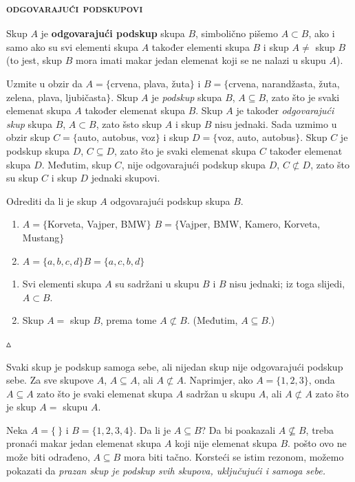\documentclass[a4paper,14pt,svgnames]{article}
\newcounter{counter}
\newcommand{\examplecounter}{\textbf{\refstepcounter{counter}PRIMJER \thecounter}}
\newcommand{\example}[3]{\begin{tcolorbox}[title=\large \examplecounter \hfill\small\textbf{"#1"}]
#2
\begin{tcolorbox}[title=\small \textbf{RJEŠENJE},colback=white]
\begin{center}
#3

\vspace{0.5em}\hfill $\vartriangle$
\end{center}
\end{tcolorbox}
\end{tcolorbox}}
\begin{document}
\subsubsection{\textsc{odgovarajući podskupovi}}
\begin{tcolorbox}
Skup $A$ je \textbf{odgovarajući podskup} skupa $B$, simbolično pišemo $A\subset B$, ako i samo ako su svi elementi skupa $A$ također elementi skupa $B$ i skup $A\neq$ skup $B$(to jest, skup $B$ mora imati makar jedan elemenat koji se ne nalazi u skupu $A$).
\end{tcolorbox}

Uzmite u obzir da $A=\{$crvena, plava, žuta$\}$ i $B=\{$crvena, narandžasta, žuta, zelena, plava, ljubičasta$\}$. Skup $A$ je \textit{podskup} skupa $B$, $A\subseteq B$, zato što je svaki elemenat skupa $A$ također elemenat skupa $B$. Skup $A$ je također \textit{odgovarajući skup} skupa $B$, $A\subset B$, zato šsto skup $A$ i skup $B$ nisu jednaki. Sada uzmimo u obzir skup $C=\{$auto, autobus, voz$\}$ i skup $D=\{$voz, auto, autobus$\}$. Skup $C$ je podskup skupa $D$, $C\subseteq D$, zato što je svaki elemenat skupa $C$ također elemenat skupa $D$. Međutim, skup $C$, nije odgovarajući podskup skupa $D$, $C\not\subset D$, zato što su skup $C$ i skup $D$ jednaki skupovi.
\newpage

\example{Da li je skup odgovarajući podskup?}{Odrediti da li je skup $A$ odgovarajući podskup skupa $B$.
\begin{enumerate}[label=\alph*),leftmargin=0.5cm]
\item $A=\{$Korveta, Vajper, BMW$\}$
$B=\{$Vajper, BMW, Kamero, Korveta, Mustang$\}$
\item $A=\{a, b, c, d\}$\quad $B=\{a, c, b, d\}$
\end{enumerate}}{\begin{enumerate}[label=\alph*),leftmargin=0.5cm]
\item Svi elementi skupa $A$ su sadržani u skupu $B$ i $B$ nisu jednaki; iz toga slijedi, $A\subset B$.
\item Skup $A=$ skup $B$, prema tome $A\not\subset B$. (Međutim, $A\subseteq B.$)
\end{enumerate}}

Svaki skup je podskup samoga sebe, ali nijedan skup nije odgovarajući podskup sebe. Za sve skupove $A$, $A\subseteq A$, ali $A\not\subset A$. Naprimjer, ako  $A=\{1, 2, 3\}$, onda $A\subseteq A$ zato što je svaki elemenat skupa $A$ sadržan u skupu $A$, ali $A\not\subset A$ zato što je skup $A=$ skupu $A$.\par
Neka $A = \{\ \}$ i $B=\{1, 2, 3, 4\}$. Da li je $A\subseteq B$? Da bi poakazali $A\nsubseteq B$, treba pronaći makar jedan elemenat skupa $A$ koji nije elemenat skupa $B$. pošto ovo ne može biti odrađeno, $A\subseteq B$ mora biti tačno. Korsteći se istim rezonom, možemo pokazati da \textit{prazan  skup je podskup svih skupova, uključujući i samoga sebe.}
\end{document}
